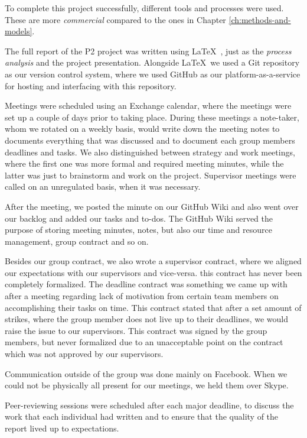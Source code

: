 To complete this project successfully, different tools and processes were used. These are more \textit{commercial} compared to the ones in Chapter \ref{ch:methods-and-models}.

The full report of the P2 project was written using \LaTeX ~, just as the \textit{process analysis} and the project presentation. Alongside \LaTeX ~we used a Git repository as our version control system, where we used GitHub as our platform-as-a-service for hosting and interfacing with this repository.

Meetings were scheduled using an Exchange calendar, where the meetings were set up a couple of days prior to taking place. During these meetings a note-taker, whom we rotated on a weekly basis, would write down the meeting notes to documents everything that was discussed and to document each group members deadlines and tasks. We also distinguished between strategy and work meetings, where the first one was more formal and required meeting minutes, while the latter was just to brainstorm and work on the project. Supervisor meetings were called on an unregulated basis, when it was necessary.

After the meeting, we posted the minute on our GitHub Wiki and also went over our backlog and added our tasks and to-dos. The GitHub Wiki served the purpose of storing meeting minutes, notes, but also our time and resource management, group contract and so on. 

Besides our group contract, we also wrote a supervisor contract, where we aligned our expectations with our supervisors and vice-versa. this contract has never been completely formalized. The deadline contract was something we came up with after a meeting regarding lack of motivation from certain team members on accomplishing their tasks on time. This contract stated that after a set amount of strikes, where the group member does not live up to their deadlines, we would raise the issue to our supervisors. This contract was signed by the group members, but never formalized due to an unacceptable point on the contract which was not approved by our supervisors.

Communication outside of the group was done mainly on Facebook. When we could not be physically all present for our meetings, we held them over Skype.

Peer-reviewing sessions were scheduled after each major deadline, to discuss the work that each individual had written and to ensure that the quality of the report lived up to expectations.

